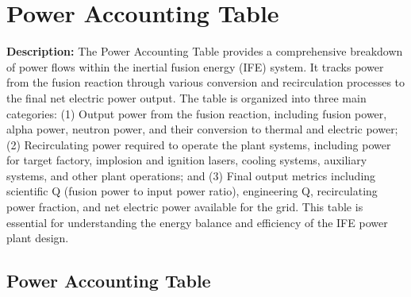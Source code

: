 \newpage
\section{Power Accounting Table}

\textbf{Description:} The Power Accounting Table provides a comprehensive breakdown of power flows within the inertial fusion energy (IFE) system. It tracks power from the fusion reaction through various conversion and recirculation processes to the final net electric power output. The table is organized into three main categories: (1) Output power from the fusion reaction, including fusion power, alpha power, neutron power, and their conversion to thermal and electric power; (2) Recirculating power required to operate the plant systems, including power for target factory, implosion and ignition lasers, cooling systems, auxiliary systems, and other plant operations; and (3) Final output metrics including scientific Q (fusion power to input power ratio), engineering Q, recirculating power fraction, and net electric power available for the grid. This table is essential for understanding the energy balance and efficiency of the IFE power plant design.

\subsection{Power Accounting Table}

